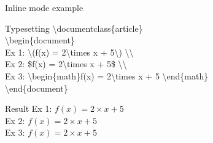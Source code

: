 \documentclass[10pt,xcolor={dvipsnames}]{beamer}
\begin{document}
		\begin{frame}{Inline mode example}
			
			\begin{block}{Typesetting}
				\textbackslash documentclass\{{\color{blue}article}\}\\
				
				\textbackslash begin\{{\color{blue}document}\}\\
				
				\quad Ex 1: {\color{orange}\textbackslash(}f(x) = 2\textbackslash times x + 5{\color{orange}\textbackslash)} \textbackslash\textbackslash\\
				
				\quad Ex 2: {\color{orange}\$}f(x) = 2\textbackslash times x + 5{\color{orange}\$} \textbackslash\textbackslash\\
				
				\quad Ex 3: \textbackslash begin\{{\color{orange}math}\}f(x) = 2\textbackslash times x + 5 \textbackslash end\{{\color{orange}math}\}\\
				
				\textbackslash end\{{\color{blue}document}\}\\
			\end{block}
				
			\begin{block}{Result}
				Ex 1: \(f(x) = 2\times x + 5\) \\
				Ex 2: $f(x) = 2\times x + 5$ \\
				Ex 3: \begin{math}	f(x) = 2\times x + 5 \end{math}
			\end{block}
			
		\end{frame}
	
\end{document}
